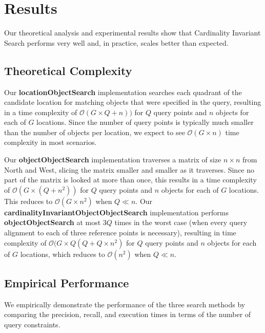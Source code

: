 \section{Results}
\label{section:results}

Our theoretical analysis and experimental results show that Cardinality Invariant Search performs very well and, in practice, scales better than expected.

\subsection{Theoretical Complexity}
Our \textbf{locationObjectSearch} implementation searches each quadrant of the candidate location for matching objects that were specified in the query, resulting in a time complexity of $\mathcal{O}(G \times Q + n))$ for $Q$ query points and $n$ objects for each of $G$ locations. 
Since the number of query points is typically much smaller than the number of objects per location, we expect to see $\mathcal{O}(G\times n)$ time complexity in most scenarios.

Our \textbf{objectObjectSearch} implementation traverses a matrix of size $n \times n$ from North and West, slicing the matrix smaller and smaller as it traverses. 
Since no part of the matrix is looked at more than once, this results in a time complexity of $\mathcal{O}(G \times (Q + n^2))$ for $Q$ query points and $n$ objects for each of $G$ locations. 
This reduces to $\mathcal{O}(G\times n^2)$ when $Q \ll n$. 
Our \textbf{cardinalityInvariantObjectObjectSearch} implementation performs \textbf{objectObjectSearch} at most $3Q$ times in the worst case (when every query alignment to each of three reference points is necessary), resulting in time complexity of $\mathcal{O}(G \times Q (Q + Q\times n^2)$ for $Q$ query points and $n$ objects for each of $G$ locations, which reduces to $\mathcal{O}(n^2)$ when $Q \ll n$. 


\subsection{Empirical Performance}
We empirically demonstrate the performance of the three search methods by comparing the precision, recall, and execution times in terms of the number of query constraints. 

